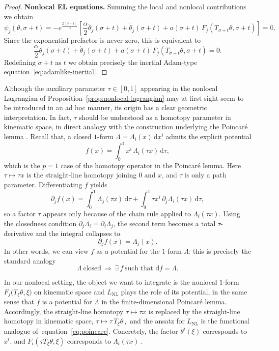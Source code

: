 \documentclass{article} %
\def\eqref#1{equation~\ref{#1}}
\begin{document}
\begin{proof}
\medskip
\noindent\textbf{Nonlocal EL equations.}
Summing the local and nonlocal contributions we obtain
\[
 \psi_j(\theta, \sigma + t)
 =
 -e^{\frac{2(\sigma + t)}{\alpha}}
 \left[
 \frac{\alpha}{2}\ddot \theta_j(\sigma+t)
 + \dot \theta_j(\sigma+t)
 +  a(\sigma + t)\,F_j(T_{\sigma + t} \theta, \sigma + t)
 \right] = 0.
\]
Since the exponential prefactor is never zero, this is equivalent to
\[
    \frac{\alpha}{2}\ddot \theta_j(\sigma+t)
    + \dot \theta_j(\sigma+t)
    +  a(\sigma + t)\,F_j(T_{\sigma + t} \theta, \sigma + t) = 0.
\]
Redefining $\sigma + t$ as $t$ we obtain precisely the inertial Adam-type equation~\ref{eq:adamlike-inertial}.
\end{proof}

Although the auxiliary parameter $\tau\in[0,1]$ appearing in the nonlocal Lagrangian of Proposition~\ref{prop:nonlocal-lagrangian} may at first sight seem to be introduced in an ad hoc manner, its origin has a clear geometric interpretation. In fact, $\tau$ should be understood as a homotopy parameter \cite{Hatcher2002AlgebraicTopology} in kinematic space, in direct analogy with the construction underlying the Poincar\'e lemma \cite{ChoquetBruhatDeWittMorette2004}. Recall that, a closed $1$-form $\Lambda=\Lambda_i(x)\,\mathrm{d}x^i$ admits the explicit potential
\begin{equation}\label{eq:poincare}
 f(x)=\int_0^1 x^i\,\Lambda_i(\tau x)\,\mathrm{d}\tau,   
\end{equation}
which is the $p=1$ case of the homotopy operator in the Poincar\'e lemma. Here $\tau\mapsto\tau x$ is the straight-line homotopy joining $0$ and $x$, and $\tau$ is only a path parameter. Differentiating $f$ yields
\begin{equation}\label{eq:diff_poincare}
 \partial_j f(x)
=
\int_0^1\Lambda_j(\tau x)\,\mathrm{d}\tau
+
\int_0^1\tau x^i\,\partial_j\Lambda_i(\tau x)\,\mathrm{d}\tau,   
\end{equation}
so a factor $\tau$ appears only because of the chain rule applied to $\Lambda_i(\tau x)$. Using the closedness condition $\partial_j\Lambda_i=\partial_i\Lambda_j$, the second term becomes a total $\tau$-derivative and the integral collapses to
\[
\partial_j f(x)=\Lambda_j(x).
\]
In other words, we can view $f$ as a potential for the $1$-form $\Lambda$: this is precisely the standard analogy
\[
\Lambda \ \text{closed} \ \Longrightarrow\ \exists\, f \ \text{such that } \mathrm{d}f=\Lambda.
\]

In our nonlocal setting, the object we want to integrate is the nonlocal $1$-form $F_j\!\bigl(T_{\xi}\theta,\xi\bigr)$ on kinematic space  and $L_{\mathrm{NL}}$ plays the role of its potential, in the same sense that $f$ is a potential for $\Lambda$ in the finite-dimensional Poincar\'e lemma. Accordingly, the straight-line homotopy $\tau\mapsto \tau x$ is replaced by the straight-line homotopy in kinematic space, $\tau \mapsto \tau\,T_\xi\theta\,,$ and the ansatz for $L_{\mathrm{NL}}$ is the functional analogue of~\eqref{eq:poincare}. Concretely, the factor $\theta^i(\xi)$ corresponds to $x^i$, and $F_i(\tau T_\xi\theta,\xi)$ corresponds to
$\Lambda_i(\tau x)\,.$
\end{document}
